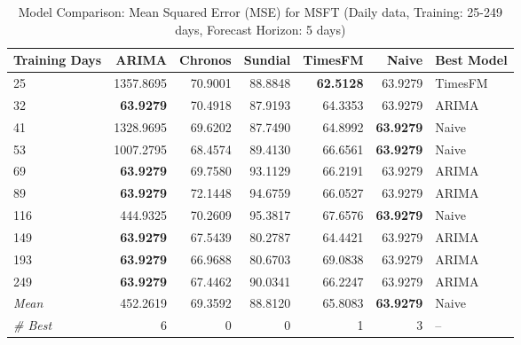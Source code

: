 \begin{table}[htbp]
\centering
\caption{Model Comparison: Mean Squared Error (MSE) for MSFT (Daily data, Training: 25-249 days, Forecast Horizon: 5 days)}
\label{tab:comparison_MSFT_1d_train-less-year-log_h5_MSE}
\small
\begin{tabular}{lrrrrrl}
\toprule
Training Days & ARIMA & Chronos & Sundial & TimesFM & Naive & Best Model \\
\midrule
25 & 1357.8695 & 70.9001 & 88.8848 & \textbf{62.5128} & 63.9279 & TimesFM \\
32 & \textbf{63.9279} & 70.4918 & 87.9193 & 64.3353 & 63.9279 & ARIMA \\
41 & 1328.9695 & 69.6202 & 87.7490 & 64.8992 & \textbf{63.9279} & Naive \\
53 & 1007.2795 & 68.4574 & 89.4130 & 66.6561 & \textbf{63.9279} & Naive \\
69 & \textbf{63.9279} & 69.7580 & 93.1129 & 66.2191 & 63.9279 & ARIMA \\
89 & \textbf{63.9279} & 72.1448 & 94.6759 & 66.0527 & 63.9279 & ARIMA \\
116 & 444.9325 & 70.2609 & 95.3817 & 67.6576 & \textbf{63.9279} & Naive \\
149 & \textbf{63.9279} & 67.5439 & 80.2787 & 64.4421 & 63.9279 & ARIMA \\
193 & \textbf{63.9279} & 66.9688 & 80.6703 & 69.0838 & 63.9279 & ARIMA \\
249 & \textbf{63.9279} & 67.4462 & 90.0341 & 66.2247 & 63.9279 & ARIMA \\
\midrule
\textit{Mean} & 452.2619 & 69.3592 & 88.8120 & 65.8083 & \textbf{63.9279} & Naive \\
\textit{\# Best} & 6 & 0 & 0 & 1 & 3 & -- \\
\bottomrule
\end{tabular}
\end{table}